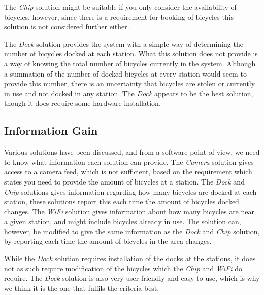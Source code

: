The \textit{Chip} solution might be suitable if you only consider the availability of bicycles, however, since there is a requirement for booking of bicycles this solution is not considered further either.

The \textit{Dock} solution provides the system with a simple way of determining the number of bicycles docked at each station.
What this solution does not provide is a way of knowing the total number of bicycles currently in the system.
Although a summation of the number of docked bicycles at every station would seem to provide this number, there is an uncertainty that bicycles are stolen or currently in use and not docked in any station.
The \textit{Dock} appears to be the best solution, though it does require some hardware installation.

\subsection{Information Gain}
Various solutions have been discussed, and from a software point of view, we need to know what information each solution can provide.
The \textit{Camera} solution gives access to a camera feed, which is not sufficient, based on the requirement which states you need to provide the amount of bicycles at a station.
The \textit{Dock} and \textit{Chip} solutions gives information regarding how many bicycles are docked at each station, these solutions report this each time the amount of bicycles docked changes.
The \textit{WiFi} solution gives information about how many bicycles are near a given station, and might include bicycles already in use.
The solution can, however, be modified to give the same information as the \textit{Dock} and \textit{Chip} solution, by reporting each time the amount of bicycles in the area changes.

While the \textit{Dock} solution requires installation of the docks at the stations, it does not as such require modification of the bicycles which the \textit{Chip} and \textit{WiFi} do require. 
The \textit{Dock} solution is also very user friendly and easy to use, which is why we think it is the one that fulfils the criteria best.